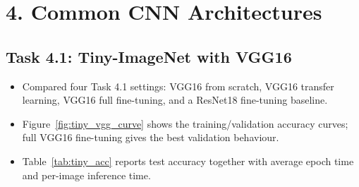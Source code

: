 
\section*{4. Common CNN Architectures}

\subsection*{Task 4.1: Tiny-ImageNet with VGG16}
\begin{itemize}
  \item Compared four Task 4.1 settings: VGG16 from scratch, VGG16 transfer learning, VGG16 full fine-tuning, and a ResNet18 fine-tuning baseline.
  \item Figure~\ref{fig:tiny_vgg_curve} shows the training/validation accuracy curves; full VGG16 fine-tuning gives the best validation behaviour.
  \item Table~\ref{tab:tiny_acc} reports test accuracy together with average epoch time and per-image inference time.
\end{itemize}

\begin{table}[!ht]
  \centering
  \scriptsize
  \caption{Task 4.1: Tiny-ImageNet results for VGG16 and ResNet18 baselines.}
  \label{tab:tiny_acc}
\end{table}


